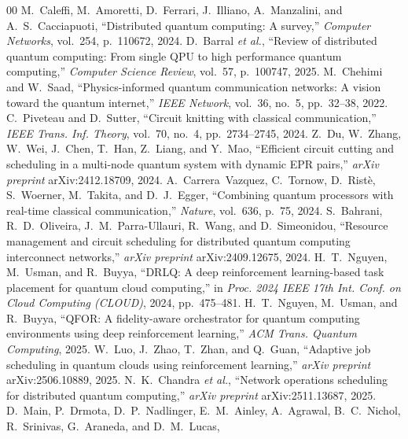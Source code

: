 \documentclass[conference]{IEEEtran}
\begin{document}
\begin{thebibliography}{00}
 M.~Caleffi, M.~Amoretti, D.~Ferrari, J.~Illiano,
A.~Manzalini, and A.~S.~Cacciapuoti, ``Distributed quantum computing: A survey,''
\emph{Computer Networks}, vol.~254, p.~110672, 2024.
 D.~Barral \emph{et al.}, ``Review of distributed
quantum computing: From single QPU to high performance quantum computing,''
\emph{Computer Science Review}, vol.~57, p.~100747, 2025.
 M.~Chehimi and W.~Saad, ``Physics-informed quantum
communication networks: A vision toward the quantum internet,'' \emph{IEEE
Network}, vol.~36, no.~5, pp.~32--38, 2022.
 C.~Piveteau and D.~Sutter, ``Circuit knitting with
classical communication,'' \emph{IEEE Trans. Inf. Theory}, vol.~70, no.~4,
pp.~2734--2745, 2024.
 Z.~Du, W.~Zhang, W.~Wei, J.~Chen, T.~Han, Z.~Liang, and
Y.~Mao, ``Efficient circuit cutting and scheduling in a multi-node quantum system
with dynamic EPR pairs,'' \emph{arXiv preprint} arXiv:2412.18709, 2024.
 A.~Carrera~Vazquez, C.~Tornow, D.~Rist\`e,
S.~Woerner, M.~Takita, and D.~J.~Egger, ``Combining quantum processors with
real-time classical communication,'' \emph{Nature}, vol.~636, p.~75, 2024.
 S.~Bahrani, R.~D.~Oliveira, J.~M.~Parra-Ullauri,
R.~Wang, and D.~Simeonidou, ``Resource management and circuit scheduling for
distributed quantum computing interconnect networks,'' \emph{arXiv preprint}
arXiv:2409.12675, 2024.
 H.~T.~Nguyen, M.~Usman, and R.~Buyya, ``DRLQ: A deep
reinforcement learning-based task placement for quantum cloud computing,'' in
\emph{Proc. 2024 IEEE 17th Int. Conf. on Cloud Computing (CLOUD)}, 2024,
pp.~475--481.
 H.~T.~Nguyen, M.~Usman, and R.~Buyya, ``QFOR: A
fidelity-aware orchestrator for quantum computing environments using deep
reinforcement learning,'' \emph{ACM Trans. Quantum Computing}, 2025.
 W.~Luo, J.~Zhao, T.~Zhan, and Q.~Guan, ``Adaptive job
scheduling in quantum clouds using reinforcement learning,'' \emph{arXiv
preprint} arXiv:2506.10889, 2025.
 N.~K.~Chandra \emph{et al.}, ``Network operations
scheduling for distributed quantum computing,'' \emph{arXiv preprint}
arXiv:2511.13687, 2025.
 D.~Main, P.~Drmota, D.~P.~Nadlinger, E.~M.~Ainley,
A.~Agrawal, B.~C.~Nichol, R.~Srinivas, G.~Araneda, and D.~M.~Lucas,

\end{thebibliography}
\end{document}
